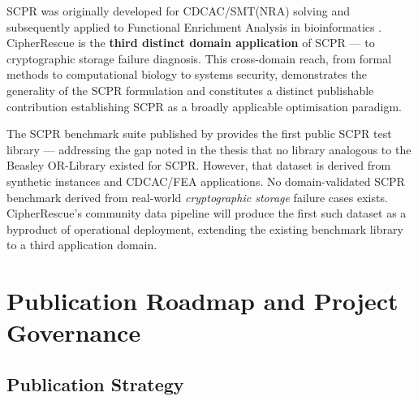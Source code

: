 \documentclass[11pt,a4paper]{report}
\begin{document}
\vspace{6pt}

\begin{tcolorbox}[enhanced, colback=lightpurple!40, colframe=purple, title={Finding 3 --- Third Domain Application of SCPR}, fonttitle=\bfseries, arc=4pt]
SCPR was originally developed for CDCAC/SMT(NRA) solving \citep{sadeghimanesh2022smt} and subsequently applied to Functional Enrichment Analysis in bioinformatics \citep{babatunde2025thesis}. CipherRescue is the \textbf{third distinct domain application} of SCPR --- to cryptographic storage failure diagnosis. This cross-domain reach, from formal methods to computational biology to systems security, demonstrates the generality of the SCPR formulation and constitutes a distinct publishable contribution establishing SCPR as a broadly applicable optimisation paradigm.
\end{tcolorbox}

\vspace{6pt}

\begin{tcolorbox}[enhanced, colback=lightamber!50, colframe=amber, title={Finding 4 --- FDE-Domain SCPR Benchmark Gap}, fonttitle=\bfseries, arc=4pt]
The SCPR benchmark suite published by \citet{babatunde2025zenodo} provides the first public SCPR test library --- addressing the gap noted in the thesis \citep{babatunde2025thesis} that no library analogous to the Beasley OR-Library \citep{beasley1990} existed for SCPR. However, that dataset is derived from synthetic instances and CDCAC/FEA applications. No domain-validated SCPR benchmark derived from real-world \emph{cryptographic storage} failure cases exists. CipherRescue's community data pipeline will produce the first such dataset as a byproduct of operational deployment, extending the existing benchmark library to a third application domain.
\end{tcolorbox}

\part{Publication Roadmap and Project Governance}

\chapter{Publication Strategy}
\end{document}
